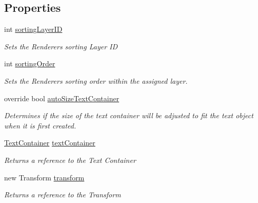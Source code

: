\subsection*{Properties}
\begin{DoxyCompactItemize}
\item 
int \mbox{\hyperlink{class_t_m_pro_1_1_text_mesh_pro_ad241e6c91dab0f2785dc72ce254ce9f4}{sorting\+Layer\+ID}}
\begin{DoxyCompactList}\small\item\em Sets the Renderer\textquotesingle{}s sorting Layer ID \end{DoxyCompactList}\item 
int \mbox{\hyperlink{class_t_m_pro_1_1_text_mesh_pro_a0ce42453d522309a1315498a8cc16e4b}{sorting\+Order}}
\begin{DoxyCompactList}\small\item\em Sets the Renderer\textquotesingle{}s sorting order within the assigned layer. \end{DoxyCompactList}\item 
override bool \mbox{\hyperlink{class_t_m_pro_1_1_text_mesh_pro_a508d9d0ba91dffc40fec00ba13e559f0}{auto\+Size\+Text\+Container}}
\begin{DoxyCompactList}\small\item\em Determines if the size of the text container will be adjusted to fit the text object when it is first created. \end{DoxyCompactList}\item 
\mbox{\hyperlink{class_t_m_pro_1_1_text_container}{Text\+Container}} \mbox{\hyperlink{class_t_m_pro_1_1_text_mesh_pro_a439781d7ef6aa16cd7ee1695ebb8f29f}{text\+Container}}
\begin{DoxyCompactList}\small\item\em Returns a reference to the Text Container \end{DoxyCompactList}\item 
new Transform \mbox{\hyperlink{class_t_m_pro_1_1_text_mesh_pro_a6748c431d98cca84eb55e16ad2a636ac}{transform}}
\begin{DoxyCompactList}\small\item\em Returns a reference to the Transform \end{DoxyCompactList}\item 

\end{DoxyCompactItemize}
